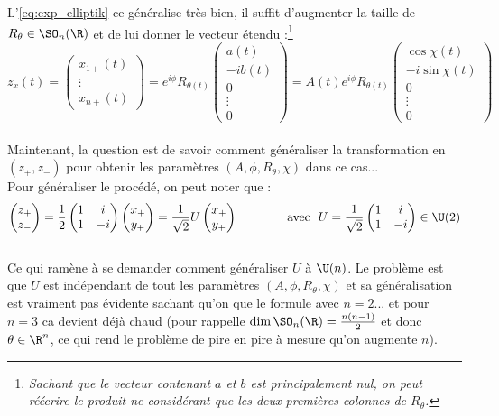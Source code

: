 L'\cref{eq:exp_elliptik} ce généralise  très bien, il suffit d'augmenter la taille de $R_\theta\in\SO_n(\R)$ et de lui donner le vecteur étendu :\footnote{\textit{Sachant que le vecteur contenant $a$ et $b$ est principalement nul, on peut réécrire le produit ne considérant que les deux premières colonnes de $R_\theta$.}}
\[z_x(t) = \begin{pmatrix}x_{1+}(t) \\ \vdots \\ 
	x_{n+}(t)\end{pmatrix} = e^{i\phi} R_{\theta(t)}\begin{pmatrix} a(t) \\ -ib(t) \\ 0 \\ \vdots \\ 0 \end{pmatrix} = A(t)e^{i\phi} R_{\theta(t)} \begin{pmatrix} \cos\chi(t) \\ -i\sin\chi(t) \\ 0 \\ \vdots \\ 0 \end{pmatrix}\]
\\

Maintenant, la question est de savoir comment généraliser la transformation en $(z_+, z_-)$ pour obtenir les paramètres $(A, \phi, R_\theta, \chi)$ dans ce cas...
\\
Pour généraliser le procédé, on peut noter que :
\[\begin{pmatrix}z_+ \\ z_-\end{pmatrix} = \frac{1}{2}\begin{pmatrix}1 & i \\ 1 & -i\end{pmatrix} \begin{pmatrix}x_+ \\ y_+\end{pmatrix} = \frac{1}{\sqrt{2}}U \begin{pmatrix}x_+ \\ y_+\end{pmatrix}\qquad\qquad \text{avec }\ U=\frac{1}{\sqrt{2}}\begin{pmatrix}1 & i \\ 1 & -i\end{pmatrix}\in\U(2)\]
\\ 
Ce qui ramène à se demander comment généraliser $U$ à $\U(n)$. Le problème est que $U$ est indépendant de tout les paramètres $(A, \phi, R_\theta, \chi)$ et sa généralisation est vraiment pas évidente sachant qu'on que le formule avec $n=2$... et pour $n=3$ ca devient déjà chaud (pour rappelle $\dim \SO_n(\R)=\frac{n(n-1)}{2}$ et donc $\theta\in\R^n$, ce qui rend le problème de pire en pire à mesure qu'on augmente $n$).



